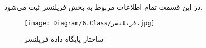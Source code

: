 در این قسمت تمام اطلاعات مربوط به بخش فریلنسر ثبت می‌شود.

\begin{figure}[H]
	\texttt{[image: Diagram/6.Class/فریلنسر.jpg]}
	\centering
	\caption{ساختار پایگاه داده فریلنسر}
	\label{fig:db:فریلنسر}
\end{figure}